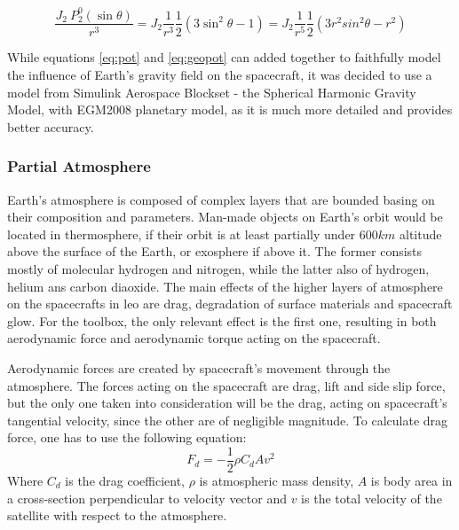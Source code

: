         \begin{equation}
            \frac{J_2\ P^0_2(\sin\theta)}{r^3} = J_2 \frac{1}{r^3} \frac{1}{2} (3\sin^2\theta -1) = J_2 \frac{1}{r^5} \frac{1}{2} (3 r^2sin^2\theta -r^2)
        \end{equation}

        While equations \eqref{eq:pot} and \eqref{eq:geopot} can added together to faithfully model the influence of Earth's gravity field on the spacecraft, it was decided to use a model from Simulink Aerospace Blockset - the Spherical Harmonic Gravity Model, with EGM2008 planetary model, as it is much more detailed and provides better accuracy.


    \subsubsection{Partial Atmosphere}\label{toolbox:atmosphere}
        Earth's atmosphere is composed of complex layers that are bounded basing on their composition and parameters. Man-made objects on Earth's orbit would be located in thermosphere, if their orbit is at least partially under $600km$ altitude above the surface of the Earth, or exosphere if above it. The former consists mostly of molecular hydrogen and nitrogen, while the latter also of hydrogen, helium ans carbon diaoxide. The main effects of the higher layers of atmosphere on the spacecrafts in \ac{leo} are drag, degradation of surface materials and spacecraft glow. For the toolbox, the only relevant effect is the first one, resulting in both aerodynamic force and aerodynamic torque acting on the spacecraft.

        Aerodynamic forces are created by spacecraft's movement through the atmosphere. The forces acting on the spacecraft are drag, lift and side slip force, but the only one taken into consideration will be the drag, acting on spacecraft's tangential velocity, since the other are of negligible magnitude. To calculate drag force, one has to use the following equation:
        \begin{equation}
            F_d = -\frac{1}{2}\rho C_d A v^2
        \end{equation}
        Where $C_d$ is the drag coefficient, $\rho$ is atmospheric mass density, $A$ is body area in a cross-section perpendicular to velocity vector and $v$ is the total velocity of the satellite with respect to the atmosphere. 

